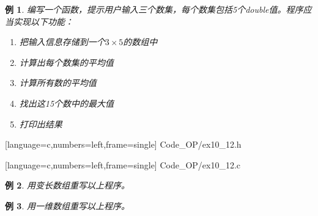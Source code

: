 \documentclass[10pt,notheorems]{beamer}
\newtheorem{li}{例}
\begin{document}
\begin{frame}[fragile]
\begin{li} 
编写一个函数，提示用户输入三个数集，每个数集包括5个double值。程序应当实现以下功能：
\begin{enumerate}
\item 把输入信息存储到一个$3\times5$的数组中
\item 计算出每个数集的平均值
\item 计算所有数的平均值
\item 找出这15个数中的最大值
\item 打印出结果
\end{enumerate}
\end{li}
\end{frame}

\begin{frame}

[language=c,numbers=left,frame=single]
{Code_OP/ex10_12.h}
\end{frame}

\begin{frame}

[language=c,numbers=left,frame=single]
{Code_OP/ex10_12.c}
\end{frame}

  

\begin{frame}[fragile]
\begin{li} 
用变长数组重写以上程序。
\end{li}
\end{frame}

\begin{frame}[fragile]
\begin{li} 
用一维数组重写以上程序。
\end{li}
\end{frame}
\end{document}
